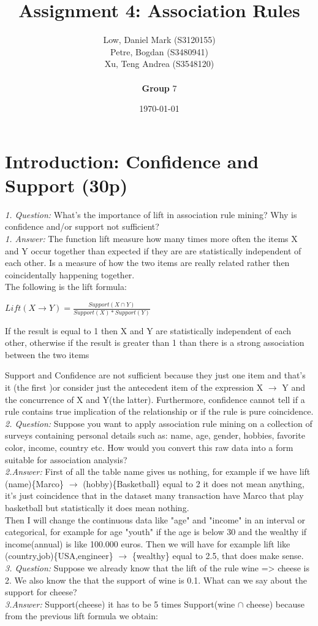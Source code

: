 \documentclass[a4paper]{article}
\title{Assignment 4: Association Rules}
\author{
Low, Daniel Mark (S3120155) \\
Petre, Bogdan (S3480941) \\
Xu, Teng Andrea (S3548120) \\ 
 \\ \textbf{Group} 7}
\date{\today}
\begin{document}
\maketitle

\section{Introduction: Confidence and Support (30p)}

\textit{1. Question:} What’s the importance of lift in association rule mining? Why is confidence and/or
support not sufficient?\\
\textit{1. Answer:} The function lift measure how many times more often the items X and Y occur together than expected if they are are statistically independent of each other. Is a measure of how the two items are really related rather then coincidentally happening together.\\
The following is the lift formula:

\begin{center}
	$Lift(X\rightarrow Y)=  \frac{Support(X \cap  Y)}{Support(X)*Support(Y)}$ 
\end{center}
If the result is equal to 1 then X and Y are statistically independent of each other, otherwise if the result is greater than 1 than there is a strong association between the two items

Support and Confidence are not sufficient because they just one item and that's it (the first )or consider just the antecedent item of the expression X $\rightarrow$ Y and the concurrence of X and Y(the latter). Furthermore, confidence cannot tell if a rule contains true implication of the relationship or if the rule is pure coincidence.\\
\newline
\textit{2. Question:} Suppose you want to apply association rule mining on a collection of surveys containing
personal details such as: name, age, gender, hobbies, favorite color, income, country etc.
How would you convert this raw data into a form suitable for association analysis? \\
\textit{2.Answer:} First of all the table name gives us nothing, for example if we have lift (name)\{Marco\} $\rightarrow$ (hobby)\{Basketball\} equal to 2 it does not mean anything, it's just coincidence that in the dataset many transaction have Marco that play basketball but statistically it does mean nothing.\\
Then I will change the continuous data like "age" and "income" in an interval or categorical, for example for age "youth" if the age is below 30 and the wealthy if income(annual) is like 100.000 euros. Then we will have for example lift like (country,job)\{USA,engineer\} $\rightarrow$ \{wealthy\} equal to 2.5, that does make sense.\\  
\newline
\textit{3. Question:} Suppose we already know that the lift of the rule wine => cheese is 2. We also know the
that the support of wine is 0.1. What can we say about the support for cheese?\\
\textit{3.Answer:} Support(cheese) it has to be 5 times Support(wine $\cap$ cheese) because from the previous lift formula we obtain:
\end{document}
